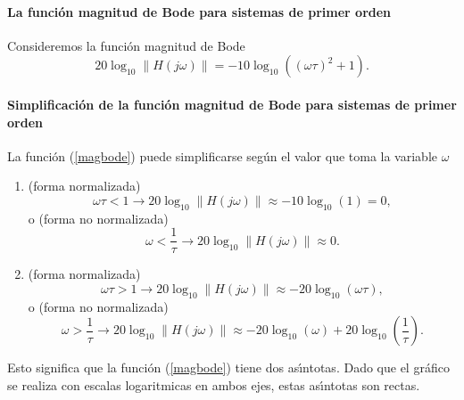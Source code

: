\paragraph{La funci\'{o}n magnitud de Bode para sistemas de primer orden}
Consideremos la funci\'{o}n magnitud de Bode 
\begin{equation}
        20\log _{10}\left\| H\left( j\omega \right) \right\| =
                -10\log _{10}\left(\left( \omega \tau \right) ^{2}+1\right) .  \label{magbode}
\end{equation}

\paragraph{Simplificaci\'{o}n de la funci\'{o}n magnitud de Bode para sistemas de primer orden}
La funci\'{o}n (\ref{magbode}) puede simplificarse seg\'{u}n el valor que toma la variable $\omega $
\begin{enumerate}
   \item  (forma normalizada) 
   \begin{equation}
      \omega \tau <1\rightarrow 20\log _{10}\left\| H\left( j\omega \right)\right\| 
          \approx -10\log _{10}\left( 1\right) =0,
   \end{equation}
   o (forma no normalizada) 
   \begin{equation}
      \omega <\frac{1}{\tau }\rightarrow 20\log _{10}\left\| H\left( j\omega\right) \right\| \approx 0.
   \end{equation}

   \item  (forma normalizada) 
   \begin{equation}
      \omega \tau >1\rightarrow 20\log _{10}\left\| H\left( j\omega \right)\right\| 
          \approx -20\log _{10}\left( \omega \tau \right) ,
   \end{equation}
   o (forma no normalizada) 
   \begin{equation}
      \omega >\frac{1}{\tau }\rightarrow 20\log _{10}\left\| H\left( j\omega\right) \right\| 
          \approx -20\log _{10}\left( \omega \right) + 20\log_{10}\left( \frac{1}{\tau }\right) .
   \end{equation}
\end{enumerate}
Esto significa que la funci\'{o}n (\ref{magbode}) tiene dos as\'{\i}ntotas. 
Dado que el gr\'{a}fico se realiza con escalas logaritmicas en ambos ejes, estas as\'{\i}ntotas son rectas.

